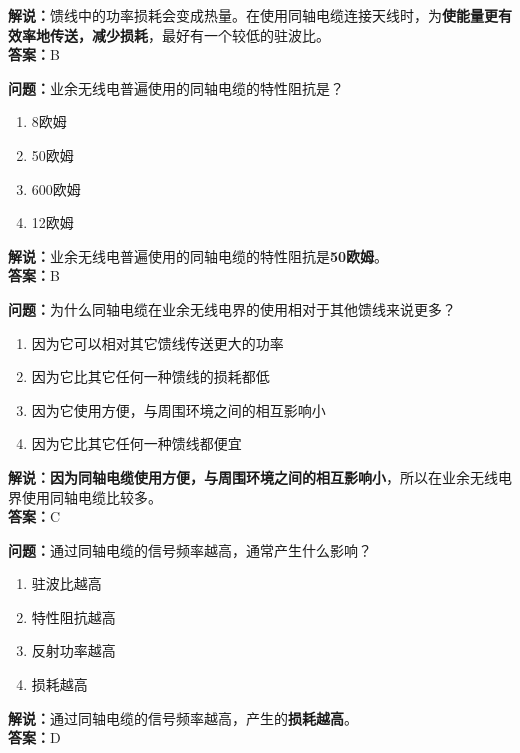 \documentclass{ctexbook}
\begin{document}
\noindent\textbf{解说：}馈线中的功率损耗会变成热量。在使用同轴电缆连接天线时，为\textbf{使能量更有效率地传送，减少损耗}，最好有一个较低的驻波比。\\\noindent\textbf{答案：}B


\bigskip


\noindent\textbf{问题：}业余无线电普遍使用的同轴电缆的特性阻抗是？

\begin{enumerate}[label=\Alph*), leftmargin=3em]
	\item 8欧姆
	\item 50欧姆
	\item 600欧姆
	\item 12欧姆
\end{enumerate}

\noindent\textbf{解说：}业余无线电普遍使用的同轴电缆的特性阻抗是\textbf{50欧姆}。\\\noindent\textbf{答案：}B


\bigskip


\noindent\textbf{问题：}为什么同轴电缆在业余无线电界的使用相对于其他馈线来说更多？

\begin{enumerate}[label=\Alph*), leftmargin=3em]
	\item 因为它可以相对其它馈线传送更大的功率
	\item 因为它比其它任何一种馈线的损耗都低
	\item 因为它使用方便，与周围环境之间的相互影响小
	\item 因为它比其它任何一种馈线都便宜
\end{enumerate}

\noindent\textbf{解说：}\textbf{因为同轴电缆使用方便，与周围环境之间的相互影响小}，所以在业余无线电界使用同轴电缆比较多。\\\noindent\textbf{答案：}C


\bigskip


\noindent\textbf{问题：}通过同轴电缆的信号频率越高，通常产生什么影响？

\begin{enumerate}[label=\Alph*), leftmargin=3em]
	\item 驻波比越高
	\item 特性阻抗越高
	\item 反射功率越高
	\item 损耗越高
\end{enumerate}

\noindent\textbf{解说：}通过同轴电缆的信号频率越高，产生的\textbf{损耗越高}。\\\noindent\textbf{答案：}D
\end{document}
